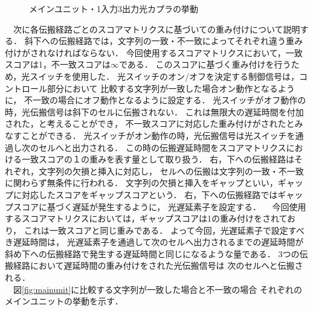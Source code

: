 \begin{itemize}
\begin{figure}[t!]
\begin{center}
\caption{メインユニット・1入力3出力光カプラの挙動}
\label{fig:mainunit_s}
\end{center}
\end{figure}
\ \ 次に各伝搬経路ごとのスコアマトリクスに基づいての重み付けについて説明する．
斜下への伝搬経路では，文字列の一致・不一致によってそれぞれ違う重み付けがされなければならない．
今回使用するスコアマトリクスにおいて，一致スコアは1，不一致スコアは$\infty$である．
このスコアに基づく重み付けを行うため，光スイッチを使用した．
光スイッチのオン/オフを決定する制御信号は，コントロール部分において
比較する文字列が一致した場合オン動作となるように，
不一致の場合にオフ動作となるように設定する．
光スイッチがオフ動作の時，光伝搬信号は斜下のセルに伝搬されない．
これは無限大の遅延時間を付加された，と考えることができ，
不一致スコアに対応した重み付けがされたとみなすことができる．
光スイッチがオン動作の時，光伝搬信号は光スイッチを通過し次のセルへと出力される．
この時の伝搬遅延時間をスコアマトリクスにおける一致スコアの１の重みを表す量として取り扱う．
右，下への伝搬経路はそれぞれ，文字列の欠損と挿入に対応し，
セルへの伝搬は文字列の一致・不一致に関わらず無条件に行われる．
文字列の欠損と挿入をギャップといい，ギャップに対応したスコアをギャップスコアという．
右，下への伝搬経路ではギャップスコアに基づく遅延が発生するように，
光遅延素子を設定する．
\ \ 今回使用するスコアマトリクスにおいては，ギャップスコアは1の重み付けをされており，
これは一致スコアと同じ重みである．
よって今回，光遅延素子で設定すべき遅延時間は，
光遅延素子を通過して次のセルへ出力されるまでの遅延時間が
斜め下への伝搬経路で発生する遅延時間と同じになるような量である．
3つの伝搬経路において遅延時間の重み付けをされた光伝搬信号は
次のセルへと伝搬される．\\
\ \ 図\ref{fig:mainunit}に比較する文字列が一致した場合と不一致の場合
それぞれのメインユニットの挙動を示す．
\begin{figure}[t!]
\begin{center}

\end{center}
\end{figure}
\end{itemize}
